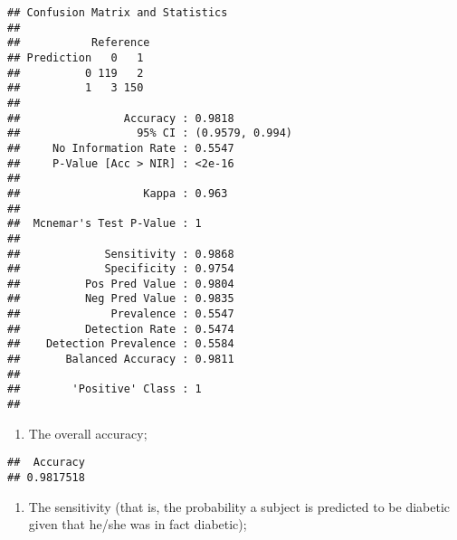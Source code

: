 \documentclass[
]{article}
\newenvironment{Shaded}{\begin{snugshade}}{\end{snugshade}}
\newcommand{\DecValTok}[1]{\textcolor[rgb]{0.00,0.00,0.81}{#1}}
\newcommand{\NormalTok}[1]{#1}
\newcommand{\SpecialCharTok}[1]{\textcolor[rgb]{0.00,0.00,0.00}{#1}}
\providecommand{\tightlist}{%
  \setlength{\itemsep}{0pt}\setlength{\parskip}{0pt}}
\begin{document}
\begin{verbatim}
## Confusion Matrix and Statistics
## 
##           Reference
## Prediction   0   1
##          0 119   2
##          1   3 150
##                                          
##                Accuracy : 0.9818         
##                  95% CI : (0.9579, 0.994)
##     No Information Rate : 0.5547         
##     P-Value [Acc > NIR] : <2e-16         
##                                          
##                   Kappa : 0.963          
##                                          
##  Mcnemar's Test P-Value : 1              
##                                          
##             Sensitivity : 0.9868         
##             Specificity : 0.9754         
##          Pos Pred Value : 0.9804         
##          Neg Pred Value : 0.9835         
##              Prevalence : 0.5547         
##          Detection Rate : 0.5474         
##    Detection Prevalence : 0.5584         
##       Balanced Accuracy : 0.9811         
##                                          
##        'Positive' Class : 1              
## 
\end{verbatim}

\begin{enumerate}
\def\labelenumi{(\roman{enumi})}
\tightlist
\item
  The overall accuracy;
\end{enumerate}

\begin{Shaded}
\end{Shaded}

\begin{verbatim}
##  Accuracy 
## 0.9817518
\end{verbatim}

\begin{enumerate}
\def\labelenumi{(\roman{enumi})}
\setcounter{enumi}{1}
\tightlist
\item
  The sensitivity (that is, the probability a subject is predicted to be
  diabetic given that he/she was in fact diabetic);
\end{enumerate}

\begin{Shaded}
\end{Shaded}
\end{document}
